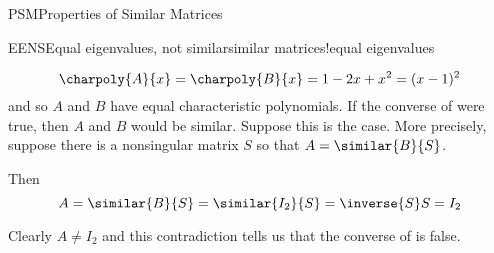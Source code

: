 \begin{subsect}{PSM}{Properties of Similar Matrices}
\begin{example}{EENS}{Equal eigenvalues, not similar}{similar matrices!equal eigenvalues}
\begin{para}
\begin{equation*}
\charpoly{A}{x}=\charpoly{B}{x}=1-2x+x^2=(x-1)^2
\end{equation*}
%
and so $A$ and $B$ have equal characteristic polynomials.  If the converse of  were true, then $A$ and $B$ would be similar.  Suppose this is the case. More precisely, suppose there is a nonsingular matrix $S$ so that $A=\similar{B}{S}$.\end{para}
%
\begin{para}Then
%
\begin{equation*}
A=\similar{B}{S}=\similar{I_2}{S}=\inverse{S}S=I_2
\end{equation*}\end{para}
%
\begin{para}Clearly $A\neq I_2$ and this contradiction tells us that the converse of  is false.\end{para}
%
\end{example}
%
%
\end{subsect}
%
